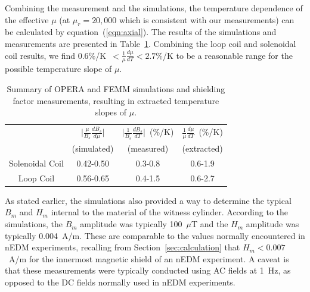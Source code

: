 Combining the measurement and the simulations, the temperature
dependence of the effective $\mu$ (at $\mu_r=20,000$ which is
consistent with our measurements) can be calculated by
equation~(\ref{eqn:axial}).  The results of the simulations and
measurements are presented in Table~\ref{tab:axialsummary}.  Combining
the loop coil and solenoidal coil results, we find
0.6\%/K~$<\frac{1}{\mu}\frac{d\mu}{dT}<2.7\%$/K to be a reasonable
range for the possible temperature slope of $\mu$.

\begin{table}
\begin{center}
\begin{tabular}{|c|c|c|c|}
\hline 
  & $\vert \frac{\mu}{B_s}\frac{dB_s}{d\mu}\vert$ & $\vert \frac{1}{B_s} \frac{dB_s}{dT}\vert$~(\%/K) & $\frac{1}{\mu}\frac{d\mu}{dT}$~(\%/K) \\ 
 & (simulated) & (measured) & (extracted) \\
\hline 
Solenoidal Coil & 0.42-0.50 & 0.3-0.8 & 0.6-1.9 \\ 
\hline 
Loop Coil & 0.56-0.65 & 0.4-1.5 & 0.6-2.7 \\ 
\hline 
\end{tabular} 
\caption{Summary of OPERA and FEMM simulations and shielding factor
  measurements, resulting in extracted temperature slopes of $\mu$.}
\label{tab:axialsummary}
\end{center}

\end{table}


As stated earlier, the simulations also provided a way to determine
the typical $B_m$ and $H_m$ internal to the material of the witness
cylinder.  According to the simulations, the $B_m$ amplitude was
typically 100~$\mu$T and the $H_m$ amplitude was typically 0.004~A/m.
These are comparable to the values normally encountered in nEDM
experiments, recalling from Section~\ref{sec:calculation} that
$H_m<0.007$~A/m for the innermost magnetic shield of an nEDM
experiment.  A caveat is that these measurements were typically
conducted using AC fields at 1~Hz, as opposed to the DC fields
normally used in nEDM experiments.
